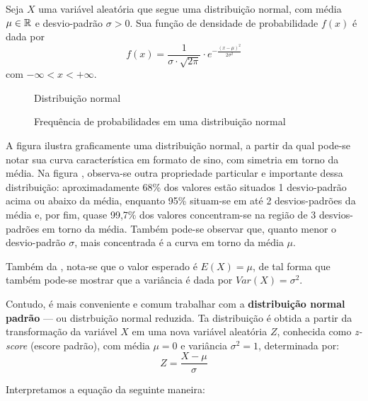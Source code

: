 Seja $X$ uma variável aleatória que segue uma distribuição normal, com média
$\mu \in \mathbb{R}$ e desvio-padrão $\sigma > 0$. Sua função de densidade de
probabilidade $f(x)$ é dada por
\begin{equation}
    f(x) = \frac{1}{\sigma \cdot \sqrt{2 \pi}} \cdot e^{-\frac{(x-\mu)^2}{2 \sigma^2}}
    \label{eq:dist-normal}
\end{equation}
com $-\infty < x < +\infty$.

\begin{figure}[htpb]
    \centering
    {}
    \caption{Distribuição normal}
    \label{fig:dist_normal1}
\end{figure}

\begin{figure}[htpb]
    \centering
    {}
    \caption{Frequência de probabilidades em uma distribuição normal}
    \label{fig:dist_normal2}
\end{figure}

A figura  ilustra graficamente uma distribuição normal,
a partir da qual pode-se notar sua curva característica em formato de sino, com
simetria em torno da média. Na figura , observa-se outra
propriedade particular e importante dessa distribuição: aproximadamente 68\%
dos valores estão situados 1 desvio-padrão acima ou abaixo da média, enquanto
95\% situam-se em até 2 desvios-padrões da média e, por fim, quase 99,7\% dos
valores concentram-se na região de 3 desvios-padrões em torno da média. Também
pode-se observar que, quanto menor o desvio-padrão $\sigma$, mais concentrada é
a curva em torno da média $\mu$.

Também da , nota-se que o valor esperado é $E(X)=\mu$,
de tal forma que também pode-se mostrar que a variância é dada por
$Var(X)=\sigma^2$.

Contudo, é mais conveniente e comum trabalhar com a \textbf{distribuição normal
padrão} --- ou distrbuição normal reduzida. Ta distribuição é obtida a partir
da transformação da variável $X$ em uma nova variável aleatória $Z$, conhecida
como \emph{z-score} (escore padrão), com média $\mu=0$ e variância
$\sigma^2=1$, determinada por:
\begin{equation}
    Z = \frac{X - \mu}{\sigma}
    \label{eq:zscore}
\end{equation}

Interpretamos a equação  da seguinte maneira:


